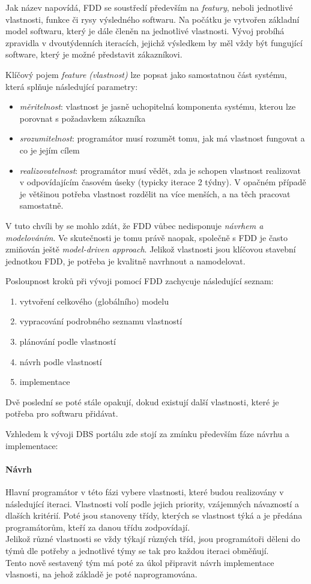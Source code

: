 Jak název napovídá, FDD se soustředí především na \emph{featury}, neboli jednotlivé vlastnosti, funkce či rysy výsledného softwaru. Na počátku je vytvořen základní model softwaru, který je dále členěn na jednotlivé vlastnosti. Vývoj probíhá zpravidla v dvoutýdenních iteracích, jejichž výsledkem by měl vždy být fungující software, který je možné představit zákazníkovi.

Klíčový pojem \emph{feature (vlastnost)}  lze popsat jako samostatnou část systému, která splňuje následující parametry:
\begin{itemize}
	\item \emph{měritelnost}: vlastnost je jasně uchopitelná komponenta systému, kterou lze porovnat s požadavkem zákazníka
	\item \emph{srozumitelnost}: programátor musí rozumět tomu, jak má vlastnost fungovat a co je jejím cílem
	\item \emph{realizovatelnost}: programátor musí vědět, zda je schopen vlastnost realizovat v odpovídajícím časovém úseky (typicky iterace 2 týdny). V opačném případě je většinou potřeba vlastnost rozdělit na více menších, a na těch pracovat samostatně.
\end{itemize}

V tuto chvíli by se mohlo zdát, že FDD vůbec nedisponuje \emph{návrhem a modelováním}. Ve skutečnosti je tomu právě naopak, společně s FDD je často zmiňován ještě \emph{model-driven approach}. Jelikož vlastnosti jsou klíčovou stavební jednotkou FDD, je potřeba je kvalitně navrhnout a namodelovat.

Posloupnost kroků při vývoji pomocí FDD zachycuje následující seznam:
\begin{enumerate}
	\item vytvoření celkového (globálního) modelu
	\item vypracování podrobného seznamu vlastností
	\item plánování podle vlastností
	\item návrh podle vlastností
	\item implementace
\end{enumerate}
Dvě poslední se poté stále opakují, dokud existují další vlastnosti, které je potřeba pro softwaru přidávat.

Vzhledem k vývoji DBS portálu zde stojí za zmínku především fáze návrhu a implementace:

\paragraph{Návrh}
Hlavní programátor v této fázi vybere vlastnosti, které budou realizovány v následující iteraci. Vlastnosti volí podle jejich priority, vzájemných návazností a dlaších kritérií. Poté jsou stanoveny třídy, kterých se vlastnost týká a je předána programátorům, kteří za danou třídu zodpovídají.\\
Jelikož různé vlastnosti se vždy týkají různých tříd, jsou programátoři děleni do týmů dle potřeby a jednotlivé týmy se tak pro každou iteraci obměňují.\\
Tento nově sestavený tým má poté za úkol připravit návrh implementace vlasnosti, na jehož základě je poté naprogramována.

